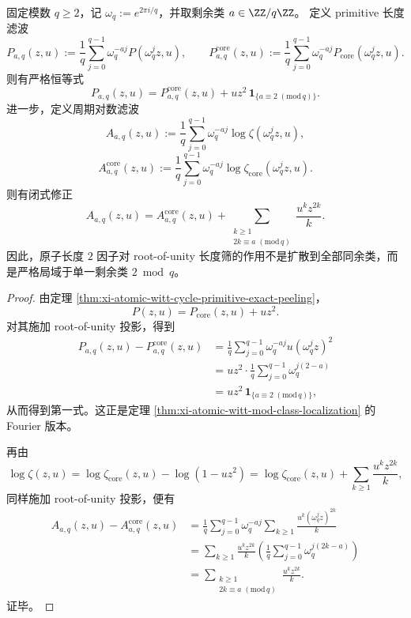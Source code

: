 \begin{theorem}[长度同余类滤波中的单类注入律]\label{thm:xi-root-unity-filter-single-class-injection}
固定模数 \(q\ge 2\)，记 \(\omega_q:=e^{2\pi i/q}\)，并取剩余类 \(a\in\ZZ/q\ZZ\)。
定义 primitive 长度滤波
\[
P_{a,q}(z,u):=\frac1q\sum_{j=0}^{q-1}\omega_q^{-aj}P(\omega_q^j z,u),
\qquad
P_{a,q}^{\mathrm{core}}(z,u):=\frac1q\sum_{j=0}^{q-1}\omega_q^{-aj}P_{\mathrm{core}}(\omega_q^j z,u).
\]
则有严格恒等式
\[
\boxed{\;
P_{a,q}(z,u)=P_{a,q}^{\mathrm{core}}(z,u)+u z^2\,\mathbf 1_{\{a\equiv 2\;(\mathrm{mod}\,q)\}}.\;}
\]
进一步，定义周期对数滤波
\[
A_{a,q}(z,u):=\frac1q\sum_{j=0}^{q-1}\omega_q^{-aj}\log\zeta(\omega_q^j z,u),
\]
\[
A_{a,q}^{\mathrm{core}}(z,u):=\frac1q\sum_{j=0}^{q-1}\omega_q^{-aj}\log\zeta_{\mathrm{core}}(\omega_q^j z,u).
\]
则有闭式修正
\[
\boxed{\;
A_{a,q}(z,u)
=
A_{a,q}^{\mathrm{core}}(z,u)
+\sum_{\substack{k\ge 1\\ 2k\equiv a\;(\mathrm{mod}\,q)}}
\frac{u^k z^{2k}}{k}.\;}
\]
因此，原子长度 \(2\) 因子对 root-of-unity 长度筛的作用不是扩散到全部同余类，而是严格局域于单一剩余类 \(2\bmod q\)。
\end{theorem}
\begin{proof}
由定理 \ref{thm:xi-atomic-witt-cycle-primitive-exact-peeling}，
\[
P(z,u)=P_{\mathrm{core}}(z,u)+u z^2.
\]
对其施加 root-of-unity 投影，得到
\[
\begin{aligned}
P_{a,q}(z,u)-P_{a,q}^{\mathrm{core}}(z,u)
&=
\frac1q\sum_{j=0}^{q-1}\omega_q^{-aj}u(\omega_q^j z)^2\\
&=
u z^2\cdot \frac1q\sum_{j=0}^{q-1}\omega_q^{j(2-a)}\\
&=
u z^2\,\mathbf 1_{\{a\equiv 2\;(\mathrm{mod}\,q)\}},
\end{aligned}
\]
从而得到第一式。这正是定理 \ref{thm:xi-atomic-witt-mod-class-localization} 的 Fourier 版本。

再由
\[
\log\zeta(z,u)
=
\log\zeta_{\mathrm{core}}(z,u)
-\log(1-uz^2)
=
\log\zeta_{\mathrm{core}}(z,u)
+\sum_{k\ge 1}\frac{u^k z^{2k}}{k},
\]
同样施加 root-of-unity 投影，便有
\[
\begin{aligned}
A_{a,q}(z,u)-A_{a,q}^{\mathrm{core}}(z,u)
&=
\frac1q\sum_{j=0}^{q-1}\omega_q^{-aj}
\sum_{k\ge 1}\frac{u^k(\omega_q^j z)^{2k}}{k}\\
&=
\sum_{k\ge 1}\frac{u^k z^{2k}}{k}
\left(
\frac1q\sum_{j=0}^{q-1}\omega_q^{j(2k-a)}
\right)\\
&=
\sum_{\substack{k\ge 1\\ 2k\equiv a\;(\mathrm{mod}\,q)}}\frac{u^k z^{2k}}{k}.
\end{aligned}
\]
证毕。
\end{proof}


